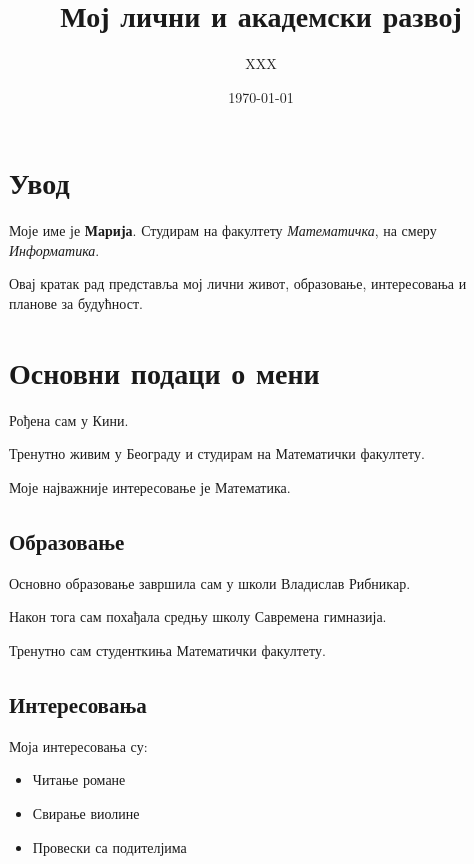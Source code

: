 \documentclass[12pt,a4paper]{article}
\begin{document}
\title{\textbf{Мој лични и академски развој}}

\author{XXX}

\date{\today}

\maketitle



\tableofcontents

\newpage



\section{Увод}

Моје име је \textbf{Марија}. Студирам на факултету
\textit{Математичка}, на смеру \textit{Информатика}.

Овај кратак рад представља мој лични живот,
образовање, интересовања и планове за будућност.



\section{Основни подаци о мени}

Рођена сам у Кини.

Тренутно живим у Београду и студирам на Математички факултету.

Моје најважније интересовање је Математика.


\subsection{Образовање}

Основно образовање завршила сам у школи Владислав Рибникар.

Након тога сам похађала средњу школу Савремена гимназија.

Тренутно сам студенткиња Математички факултету.


\subsection{Интересовања}

Моја интересовања су:

\begin{itemize}
    \item Читање романе
    \item Свирање виолине
    \item Провески са подителјима
\end{itemize}
\end{document}
